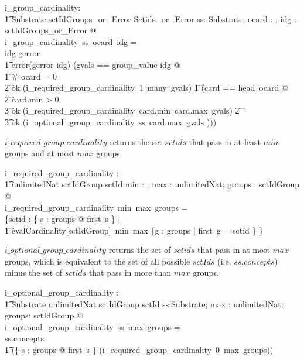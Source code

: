 \documentclass{article}
\begin{document}
\begin{axdef}
   i\_group\_cardinality: \\
\t1 Substrate \fun \optional[cardinality] \fun sctIdGroups\_or\_Error \fun Sctids\_or\_Error
\where
   \forall ss: Substrate; ocard : \optional[cardinality]; idg : sctIdGroups\_or\_Error @ \\
   i\_group\_cardinality~ss~ocard~idg = \\
   \IF idg \in \ran gerror \THEN \\
   \t1 error(gerror \inv idg)
\also
\ELSE (\LET gvals == group\_value \inv idg @ \\
\t1 \IF \# ocard = 0 \THEN \\
\t2 ok (i\_required\_group\_cardinality~1~many~gvals)
\also
\t1 \ELSE (\LET card == head~ocard @ \\
\t2  \IF card.min > 0 \THEN \\
\t3  ok (i\_required\_group\_cardinality~card.min~card.max~gvals)
\also
\t2 \ELSE \\
\t3 ok (i\_optional\_group\_cardinality~ss~card.max~gvals )))
\end{axdef}


$i\_required\_group\_cardinality$ returns the set  $sctids$ that pass in at least $min$ groups and at most $max$ groups
\begin{axdef}
   i\_required\_group\_cardinality : \\
\t1 \nat \fun unlimitedNat \fun \power sctIdGroup \fun \power sctId
\where
   \forall min : \nat; max : unlimitedNat; groups : \power sctIdGroup  @ \\
i\_required\_group\_cardinality~min~max~groups = \\
\{sctid :  \{ s : groups @ first~s \} | \\
\t1 evalCardinality[sctIdGroup]~min~max \{g : groups | first~g = sctid \} \neq \emptyset \}
\end{axdef}

$i\_optional\_group\_cardinality$ returns the set of $sctids$ that pass in at most $max$ groups, which is equivalent to the
set of all possible $sctIds$ (i.e. $ss.concepts$) minus the set of $sctids$ that pass in more than $max$ groups.

\begin{axdef}
   i\_optional\_group\_cardinality : \\
\t1 Substrate \fun unlimitedNat \fun \power sctIdGroup  \fun \power sctId
\where
   \forall ss:Substrate; max : unlimitedNat; groups: \power sctIdGroup  @ \\
i\_optional\_group\_cardinality~ss~max~groups = \\
ss.concepts \setminus \\
\t1 (\{ s : groups @ first~s \} \setminus (i\_required\_group\_cardinality~0~max~groups)) 
\end{axdef}
\end{document}
